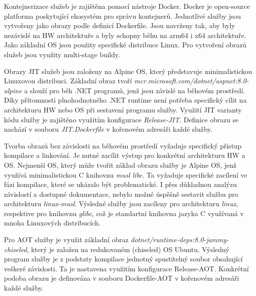 

Kontejnerizace služeb je zajištěna pomocí nástroje Docker. Docker je open-source platforma poskytující ekosystém pro správu kontejnerů. Jednotlivé služby jsou vytvořeny jako obrazy podle definicí Dockerfile. Jsou navrženy tak, aby byly nezávislé na HW architektuře a byly schopny běhu na arm64 i x64 architektuře. Jako základní OS jsou použity specifické distribuce Linux. Pro vytvoření obrazů služeb jsou využity multi-stage buildy.

Obrazy JIT služeb jsou založeny na Alpine OS, který představuje minimalistickou Linuxovou distribuci. Základní obraz tvoří \emph{mcr.microsoft.com/dotnet/aspnet:8.0-alpine} a slouží pro běh .NET programů, jenž jsou závislé na běhovém prostředí. Díky přítomnosti plnohodnotného .NET runtime není potřeba specifický cílit na architekturu HW nebo OS při sestavení programu služby. Využití JIT varianty kódu služby je zajištěno využitím konfigurace \emph{Release-JIT}. Definice obrazu se nachází v souboru \emph{JIT.Dockerfile} v kořenovém adresáři každé služby.

Tvorba obrazů bez závislosti na běhovém prostředí vyžaduje specifický přístup kompilace a linkování. Je nutné zacílit výstup pro konkrétní architekturu HW a OS. Nejmenší OS, který může tvořit základ obrazu služby je Alpine OS, jenž využívá minimalistickou C knihovnu \emph{musl libc}. Ta vyžaduje specifické zacílení ve fázi kompilace, které se ukázalo být problematické. I přes důkladnou analýzu závislostí a dostupné dokumentace, nebylo možné úspěšně sestavit službu pro architekturu \emph{linux-musl}. Výsledné služby jsou zacíleny pro architekturu \emph{linux}, respektive pro knihovnu \emph{glibc}, což je standartní knihovna jazyka C využívaná v mnoha Linuxových distribucích. 

Pro AOT služby je využit základní obraz \emph{dotnet/runtime-deps:8.0-jammy-chiseled}, který je založen na redukovaném (chiseled) OS Ubuntu. Výsledný program služby je z podstaty kompilace jednotný spustitelný soubor obsahující veškeré závislosti. Ta je nastavena využitím konfigurace Release-AOT. Konkrétní podoba obrazu je definována v souboru Dockerfile-AOT v kořenovém adresáři každé služby.

